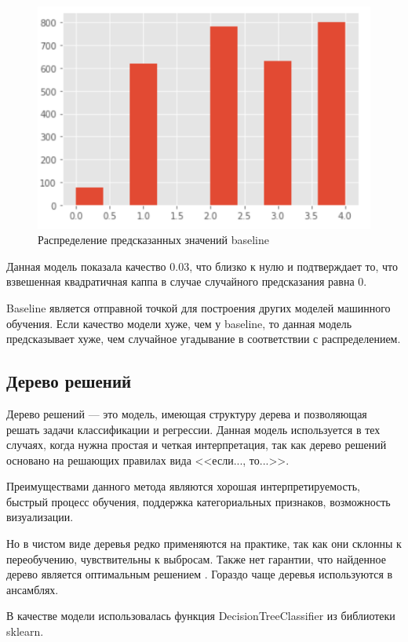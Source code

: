 \documentclass[14pt]{mmcs_article}
\begin{document}
\begin{figure}[H]
	\centering
	\includegraphics[scale=1]{baseline.png}
	\caption{Распределение предсказанных значений baseline}\label{models:baseline}
\end{figure}

Данная модель показала качество 0.03, что близко к нулю и подтверждает то, что взвешенная квадратичная каппа в случае случайного предсказания равна 0.

Baseline является отправной точкой для построения других моделей машинного обучения. Если качество модели хуже, чем у baseline, то данная модель предсказывает хуже, чем случайное угадывание в соответствии с распределением.


\subsection{Дерево решений}

Дерево решений --- это модель, имеющая структуру дерева и позволяющая решать задачи классификации и регрессии. Данная модель используется в тех случаях, когда нужна простая и четкая интерпретация, так как дерево решений основано на решающих правилах вида <<если..., то...>>. 
 
Преимуществами данного метода являются хорошая интерпретируемость, быстрый процесс обучения, поддержка категориальных признаков, возможность визуализации.

Но в чистом виде деревья редко применяются на практике, так как они склонны к переобучению, чувствительны к выбросам. Также нет гарантии, что найденное дерево является оптимальным решением \cite{lib:trees}. Гораздо чаще деревья используются в ансамблях.

В качестве модели использовалась функция DecisionTreeClassifier из библиотеки sklearn.
\end{document}
